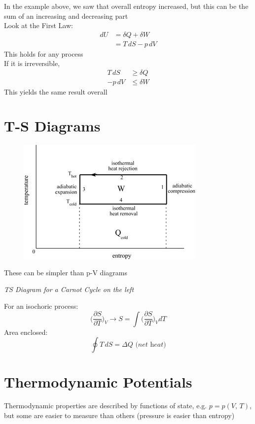 \documentclass[a4paper, 11pt, normalem]{report}
\newcommand\p{\partial}
\begin{document}
In the example above, we saw that overall entropy increased, but this can be the sum of an increasing and decreasing part \\
Look at the First Law:
\begin{align*}
    dU &= \delta Q + \delta W \\
       &= T\,dS - p\,dV
\end{align*}
This holds for any process \\
If it is irreversible,
\begin{align*}
    T\,dS &\geq \delta Q \\
    -p\,dV &\leq \delta W
\end{align*}
This yields the same result overall

\section{T-S Diagrams}
\begin{figure}
    \begin{center}
        \includegraphics[scale=0.4]{TSDiag.png}
        \vspace{-30pt}
    \end{center}
\end{figure}

These can be simpler than p-V diagrams

\textit{TS Diagram for a Carnot Cycle on the left}

For an isochoric process:
\begin{equation*}
    \Big(\frac{\p S}{\p T} \Big)_V \to S = \int \Big(\frac{\p S}{\p T} \Big)_V dT
\end{equation*}
Area enclosed:
\begin{equation*}
    \oint T\,dS = \Delta Q \textit{ (net heat)}
\end{equation*}

\section{Thermodynamic Potentials}
Thermodynamic properties are described by functions of state, e.g. $p = p(V,\,T)$, but some are easier to measure than others (pressure is easier than entropy)
\end{document}
